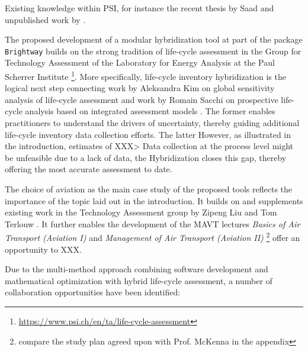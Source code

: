 \documentclass{article}
\begin{document}
Existing knowledge within PSI, for instance the recent thesis by Saad \cite{saad_synthetic_2022} and unpublished work by \cite{sacchi_climate-neutral_2022}.

    The proposed development of a modular hybridization tool at part of the package \texttt{Brightway} builds on the strong tradition of life-cycle assessment in the Group for Technology Assessment of the Laboratory for Energy Analysis at the Paul Scherrer Institute \footnote{\url{https://www.psi.ch/en/ta/life-cycle-assessment}}. More specifically, life-cycle inventory hybridization is the logical next step connecting work by Aleksandra Kim on global sensitivity analysis of life-cycle assessment \cite{kim_aleksandra-kimgwp_uncertainties_2022}\cite{kim_aleksandra-kimgsa_framework_2021}\cite{paulillo_influential_2021} and work by Romain Sacchi on prospective life-cycle analysis based on integrated assessment models \cite{noauthor_premise_2022}\cite{sacchi_prospective_2022}. The former enables practitioners to understand the drivers of uncertainty, thereby guiding additional life-cycle inventory data collection efforts. The latter 
    However, as illustrated in the introduction, estimates of XXX> Data collection at the process level might be unfeasible due to a lack of data, the 
    Hybridization closes this gap, thereby offering the most accurate assessment to date.
    
    The choice of aviation as the main case study of the proposed tools reflects the importance of the topic laid out in the introduction. It builds on and supplements existing work in the Technology Assessment group by Zipeng Liu and Tom Terlouw \cite{terlouw_large-scale_2022}. It further enables the development of the MAVT lectures \textit{Basics of Air Transport (Aviation I)} and \textit{Management of Air Transport (Aviation II)} \footnote{compare the study plan agreed upon with Prof. McKenna in the appendix} offer an opportunity to XXX.
    
    Due to the multi-method approach combining software development and mathematical optimization with hybrid life-cycle assessment, a number of collaboration opportunities have been identified:
	
\end{document}
